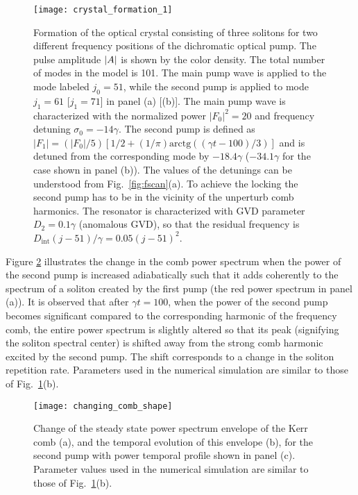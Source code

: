 %
\begin{figure}[tbp]
  \centering
  \texttt{[image: crystal\_formation\_1]}
\caption{ \small Formation of the optical crystal consisting of three solitons for two different frequency positions of the dichromatic optical pump. The pulse amplitude $\lvert A\rvert$ is shown by the color density. The total number of modes in the model is 101. The main pump wave is applied to the mode labeled $j_0=51$, while the second pump is applied to mode $j_1=61$ [$j_1=71$] in panel (a) [(b)]. The main pump wave is characterized with the normalized power $|F_0|^2=20$ and frequency detuning $\sigma_0 = -14 \gamma$. The second pump is defined as $|F_1|=(|F_0|/5)[1/2 + (1/\pi) \mathrm{arctg}((\gamma t-100)/3)]$ and is detuned from the corresponding mode by $-18.4 \gamma$ ($-34.1 \gamma$ for the case shown in panel (b)). The values of the detunings can be understood from Fig.~\ref{fig:fscan}(a). To achieve the locking the second pump has to be in the vicinity of the unperturb comb harmonics. The resonator is characterized with GVD parameter $D_2=0.1\gamma$ (anomalous GVD), so that the residual frequency is $D_\mathrm{int}(j-51)/\gamma=0.05(j - 51)^2$.
} \label{fig:Xtalform}
\end{figure}
%

Figure \ref{fig:combchange} illustrates the change in the comb power spectrum when the power of the second pump is increased adiabatically such that it adds coherently to the spectrum of a soliton created by the first pump (the red power spectrum in panel (a)). It is observed that after $\gamma t = 100$, when the power of the second pump becomes significant compared to the corresponding harmonic of the frequency comb, the entire power spectrum is slightly altered so that its peak (signifying the soliton spectral center) is shifted away from the strong comb harmonic excited by the second pump. The shift corresponds to a change in the soliton repetition rate. Parameters used in the numerical simulation are similar to those of Fig.~\ref{fig:Xtalform}(b). 
%
\begin{figure}[tbp]
  \centering
  \texttt{[image: changing\_comb\_shape]}
\caption{ \small Change of the steady state power spectrum envelope of the Kerr comb (a), and the temporal evolution of this envelope (b), for the second pump with power temporal profile shown in panel (c). Parameter values used in the numerical simulation are similar to those of Fig.~\ref{fig:Xtalform}(b).
} \label{fig:combchange}
\end{figure}
%

